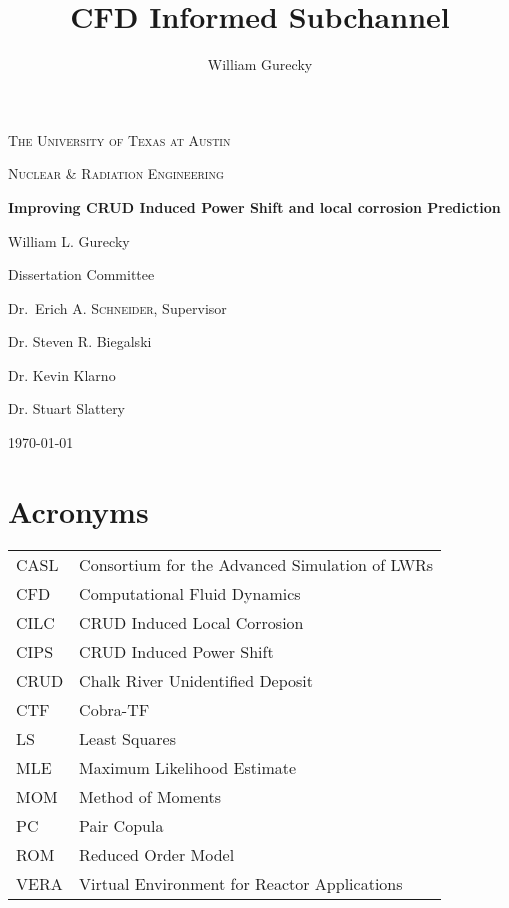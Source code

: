 \documentclass[10pt,a4paper]{report}
\author{William Gurecky}
\title{CFD Informed Subchannel}
\begin{document}
\begin{titlepage}
	\centering
	{\scshape\LARGE The University of Texas at Austin \par}
	\vspace{1cm}
	{\scshape\Large Nuclear \& Radiation Engineering \par}
	\vspace{1.5cm}
	{\huge\bfseries Improving CRUD Induced Power Shift and local corrosion Prediction \par}
	\vspace{2cm}
	{\Large William L. Gurecky \par}
	\vfill

	\begin{flushright}
	Dissertation Committee \par
	\bigskip
	Dr.~Erich A. \textsc{Schneider}, Supervisor \par
	Dr. Steven R. Biegalski \par
	Dr. Kevin Klarno \par
	Dr. Stuart Slattery \par
	\end{flushright}
	\vfill
	{\large \today\par}
\end{titlepage}
\pagebreak
\tableofcontents
\pagebreak

\section*{Acronyms}
\begin{tabular}{l l}
CASL & Consortium for the Advanced Simulation of LWRs \\
CFD &  Computational Fluid Dynamics \\
CILC & CRUD Induced Local Corrosion \\
CIPS & CRUD Induced Power Shift \\
CRUD & Chalk River Unidentified Deposit \\
CTF &  Cobra-TF \\
LS  &  Least Squares \\
MLE &  Maximum Likelihood Estimate \\
MOM &  Method of Moments \\
PC  &  Pair Copula \\
ROM &  Reduced Order Model \\
VERA & Virtual Environment for Reactor Applications \\
\end{tabular}
\end{document}
